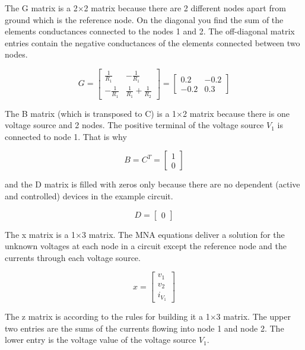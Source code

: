 \documentclass[10pt]{report}
\begin{document}
The G matrix is a 2$\times$2 matrix because there are 2 different
nodes apart from ground which is the reference node.  On the diagonal
you find the sum of the elements conductances connected to the nodes 1
and 2.  The off-diagonal matrix entries contain the negative
conductances of the elements connected between two nodes.

\begin{equation}
G =
\begin{bmatrix}
\frac{1}{R_{1}} & -\frac{1}{R_{1}}\\
-\frac{1}{R_{1}} & \frac{1}{R_{1}} + \frac{1}{R_{2}}
\end{bmatrix}
=
\begin{bmatrix}
0.2 & -0.2\\
-0.2 & 0.3
\end{bmatrix}
\end{equation}

The B matrix (which is transposed to C) is a 1$\times$2 matrix because
there is one voltage source and 2 nodes.  The positive terminal of the
voltage source $V_{1}$ is connected to node 1.  That is why

\begin{equation}
B = C^{T} =
\begin{bmatrix}
1\\
0
\end{bmatrix}
\end{equation}

and the D matrix is filled with zeros only because there are no dependent
(active and controlled) devices in the example circuit.

\begin{equation}
D =
\begin{bmatrix}
0
\end{bmatrix}
\end{equation}

The x matrix is a 1$\times$3 matrix.  The MNA equations deliver a
solution for the unknown voltages at each node in a circuit except the
reference node and the currents through each voltage source.

\begin{equation}
x =
\begin{bmatrix}
v_{1}\\
v_{2}\\
i_{V_{1}}
\end{bmatrix}
\end{equation}

The z matrix is according to the rules for building it a 1$\times$3
matrix.  The upper two entries are the sums of the currents flowing
into node 1 and node 2.  The lower entry is the voltage value of the
voltage source $V_{1}$.
\end{document}
